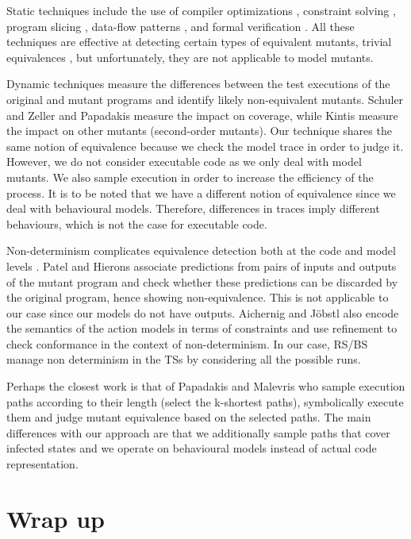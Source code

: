 Static techniques include the use of compiler optimizations \cite{Offutt1994}, constraint solving \cite{Offutt1997}, program slicing \cite{Hierons1999}, data-flow patterns \cite{Kintis2015}, and formal verification \cite{Bardin2015}. All these techniques are effective at detecting certain types of equivalent mutants, \ie trivial equivalences \cite{Papadakis2015}, but unfortunately, they are not applicable to model mutants.

Dynamic techniques measure the differences between the test executions of the original and mutant programs and identify likely non-equivalent mutants. Schuler and Zeller \cite{Schuler2013} and Papadakis \etal \cite{Papadakis2014a} measure the impact on coverage, while Kintis \etal \cite{Kintis2015a} measure the impact on other mutants (second-order mutants). Our technique shares the same notion of equivalence because we check the model trace in order to judge it. However, we do not consider executable code as we only deal with model mutants. We also sample execution in order to increase the efficiency of the process. It is to be noted that we have a different notion of equivalence since we deal with behavioural models. Therefore, differences in traces imply different behaviours, which is not the case for executable code.

Non-determinism complicates equivalence detection both at the code \cite{Patel2016} and model levels \cite{Aichernig2012}. Patel and Hierons \cite{Patel2016} associate predictions from pairs of inputs and outputs of the mutant program and check whether these predictions can be discarded by the original program, hence showing non-equivalence. This is not applicable to our case since our models do not have outputs. Aichernig and J{\"o}bstl \cite{Aichernig2012} also encode the semantics of the action models in terms of constraints and use refinement to check conformance in the context of non-determinism. In our case, RS/BS manage non determinism in the TSs by considering all the possible runs. 

Perhaps the closest work is that of Papadakis and Malevris \cite{Papadakis2012} who sample execution paths according to their length (select the k-shortest paths), symbolically execute them and judge mutant equivalence based on the selected paths. The main differences with our approach are that we additionally sample paths that cover infected states and we operate on behavioural models instead of actual code representation.  


\section{Wrap up}

